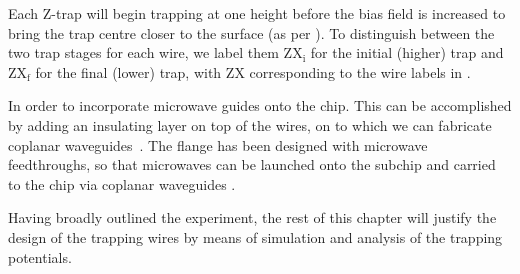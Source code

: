 Each Z-trap will begin trapping at one height before the bias field is
increased to bring the trap centre closer to the surface (as per
).  To distinguish between the two trap stages for
each wire, we label them $\mathrm{ZX_i}$ for the initial (higher) trap and
$\mathrm{ZX_f}$ for the final (lower) trap, with $\mathrm{ZX}$ corresponding to
the wire labels in .

In order to incorporate microwave guides onto the chip. This can be
accomplished by adding an insulating layer on top of the wires, on to which we
can fabricate coplanar waveguides~\cite{1127105}. The flange has been designed
with microwave feedthroughs, so that microwaves can be launched onto the
subchip and carried to the chip via coplanar waveguides .

Having broadly outlined the experiment, the rest of this chapter will justify
the design of the trapping wires by means of simulation and analysis
of the trapping potentials.

